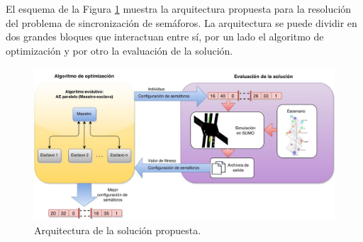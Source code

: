 

El esquema de la Figura \ref{fig:arquitectura1}  muestra la arquitectura propuesta para la resolución del problema de sincronización de semáforos. La arquitectura se puede dividir en dos grandes bloques que interactuan entre sí, por un lado el algoritmo de optimización y por otro la evaluación de la solución. 

\begin{figure}[ht]
	\centering
	\includegraphics[width=0.99\linewidth]{Figures/arquitectura1}
	\caption{Arquitectura de la solución propuesta.}
	\label{fig:arquitectura1}
\end{figure}

